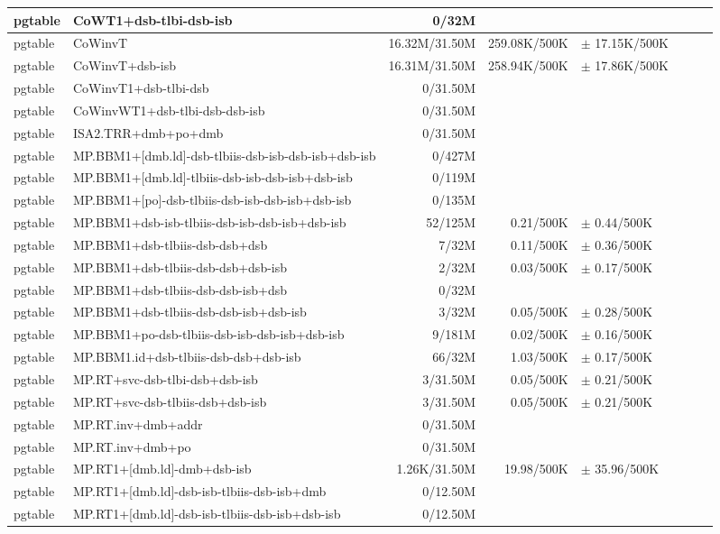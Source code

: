 \begin{tabular}{l l  | r r l | r r l}
\hline
   pgtable&CoWT1+dsb-tlbi-dsb-isb&0/32M&&&\\
\hline
   pgtable&CoWinvT&16.32M/31.50M&259.08K/500K&$\pm$ 17.15K/500K&\\
\hline
   pgtable&CoWinvT+dsb-isb&16.31M/31.50M&258.94K/500K&$\pm$ 17.86K/500K&\\
\hline
   pgtable&CoWinvT1+dsb-tlbi-dsb&0/31.50M&&&\\
\hline
   pgtable&CoWinvWT1+dsb-tlbi-dsb-dsb-isb&0/31.50M&&&\\
\hline
   pgtable&ISA2.TRR+dmb+po+dmb&0/31.50M&&&\\
\hline
   pgtable&MP.BBM1+[dmb.ld]-dsb-tlbiis-dsb-isb-dsb-isb+dsb-isb&0/427M&&&\\
\hline
   pgtable&MP.BBM1+[dmb.ld]-tlbiis-dsb-isb-dsb-isb+dsb-isb&0/119M&&&\\
\hline
   pgtable&MP.BBM1+[po]-dsb-tlbiis-dsb-isb-dsb-isb+dsb-isb&0/135M&&&\\
\hline
   pgtable&MP.BBM1+dsb-isb-tlbiis-dsb-isb-dsb-isb+dsb-isb&52/125M&0.21/500K&$\pm$ 0.44/500K&\\
\hline
   pgtable&MP.BBM1+dsb-tlbiis-dsb-dsb+dsb&7/32M&0.11/500K&$\pm$ 0.36/500K&\\
\hline
   pgtable&MP.BBM1+dsb-tlbiis-dsb-dsb+dsb-isb&2/32M&0.03/500K&$\pm$ 0.17/500K&\\
\hline
   pgtable&MP.BBM1+dsb-tlbiis-dsb-dsb-isb+dsb&0/32M&&&\\
\hline
   pgtable&MP.BBM1+dsb-tlbiis-dsb-dsb-isb+dsb-isb&3/32M&0.05/500K&$\pm$ 0.28/500K&\\
\hline
   pgtable&MP.BBM1+po-dsb-tlbiis-dsb-isb-dsb-isb+dsb-isb&9/181M&0.02/500K&$\pm$ 0.16/500K&\\
\hline
   pgtable&MP.BBM1.id+dsb-tlbiis-dsb-dsb+dsb-isb&66/32M&1.03/500K&$\pm$ 0.17/500K&\\
\hline
   pgtable&MP.RT+svc-dsb-tlbi-dsb+dsb-isb&3/31.50M&0.05/500K&$\pm$ 0.21/500K&\\
\hline
   pgtable&MP.RT+svc-dsb-tlbiis-dsb+dsb-isb&3/31.50M&0.05/500K&$\pm$ 0.21/500K&\\
\hline
   pgtable&MP.RT.inv+dmb+addr&0/31.50M&&&\\
\hline
   pgtable&MP.RT.inv+dmb+po&0/31.50M&&&\\
\hline
   pgtable&MP.RT1+[dmb.ld]-dmb+dsb-isb&1.26K/31.50M&19.98/500K&$\pm$ 35.96/500K&\\
\hline
   pgtable&MP.RT1+[dmb.ld]-dsb-isb-tlbiis-dsb-isb+dmb&0/12.50M&&&\\
\hline
   pgtable&MP.RT1+[dmb.ld]-dsb-isb-tlbiis-dsb-isb+dsb-isb&0/12.50M&&&\\

\end{tabular}
